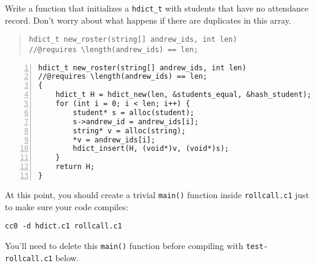\begin{part}
  Write a function that initializes a \lstinline'hdict_t' with students
  that have no attendance record. Don't worry about what happens if
  there are duplicates in this array.
\begin{quote}
\begin{lstlisting}[belowskip=0pt]
hdict_t new_roster(string[] andrew_ids, int len)
//@requires \length(andrew_ids) == len;
\end{lstlisting}
\twoPT
\end{quote}

\begin{solution}
\begin{lstlisting}[numbers=left, name="rollcall"]
hdict_t new_roster(string[] andrew_ids, int len)
//@requires \length(andrew_ids) == len;
{
    hdict_t H = hdict_new(len, &students_equal, &hash_student);
    for (int i = 0; i < len; i++) {
        student* s = alloc(student);
        s->andrew_id = andrew_ids[i];
        string* v = alloc(string);
        *v = andrew_ids[i];
        hdict_insert(H, (void*)v, (void*)s);
    }
    return H;
}
\end{lstlisting}
\end{solution}
\end{part}

At this point, you should create a trivial \lstinline'main()' function
inside \lstinline'rollcall.c1'
just to make sure your code compiles:
\begin{lstlisting}[language={[coin]C}]
cc0 -d hdict.c1 rollcall.c1
\end{lstlisting}
You'll need to delete this \lstinline'main()'
function before compiling with \lstinline'test-rollcall.c1' below.

